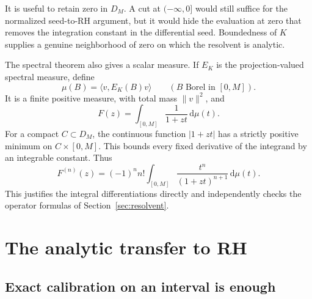 \documentclass[11pt,a4paper]{article}
\numberwithin{equation}{section}
\theoremstyle{definition}
\theoremstyle{remark}
\newcommand{\ip}[2]{\langle #1,#2\rangle}
\newcommand{\norm}[1]{\lVert #1\rVert}
\newcommand{\dd}{\,\mathrm d}
\begin{document}
It is useful to retain zero in $D_M$. A cut at $(-\infty,0]$ would still
suffice for the normalized seed-to-RH argument, but it would hide the
evaluation at zero that removes the integration constant in the
differential seed. Boundedness of $K$ supplies a genuine neighborhood of
zero on which the resolvent is analytic.

The spectral theorem also gives a scalar measure. If $E_K$ is the
projection-valued spectral measure, define
\begin{equation}\label{eq:measure}
\mu(B)=\ip v{E_K(B)v}\qquad(B\text{ Borel in }[0,M]).
\end{equation}
It is a finite positive measure, with total mass $\norm v^2$, and
\begin{equation}\label{eq:measure-resolvent}
F(z)=\int_{[0,M]}\frac{1}{1+zt}\dd\mu(t).
\end{equation}
For a compact $C\subset D_M$, the continuous function $|1+zt|$ has a
strictly positive minimum on $C\times[0,M]$. This bounds every fixed
derivative of the integrand by an integrable constant. Thus
\begin{equation}\label{eq:measure-derivatives}
F^{(n)}(z)=(-1)^n n!\int_{[0,M]}
\frac{t^n}{(1+zt)^{n+1}}\dd\mu(t).
\end{equation}
This justifies the integral differentiations directly and independently
checks the operator formulas of Section~\ref{sec:resolvent}.

\section[Transfer to RH]{The analytic transfer to RH}\label{sec:forward}

\subsection{Exact calibration on an interval is enough}
\end{document}
